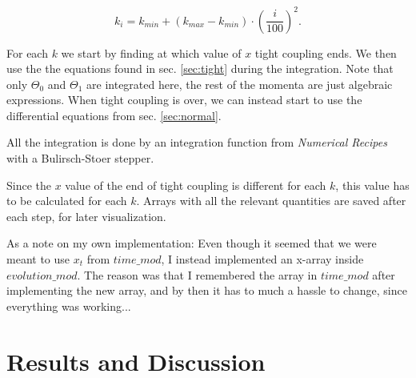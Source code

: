 \documentclass[a4paper,norsk, 10pt]{article}
\begin{document}
\begin{equation}
k_i = k_{min} + (k_{max}-k_{min})\cdot\left(\frac{i}{100}\right)^2.
\end{equation}

For each $k$ we start by finding at which value of $x$ tight coupling ends. We then use the the equations found in sec. \ref{sec:tight} during the integration. Note that only $\Theta_0$ and $\Theta_1$ are integrated here, the rest of the momenta are just algebraic expressions. When tight coupling is over, we can instead start to use the differential equations from sec. \ref{sec:normal}. 

All the integration is done by an integration function from \textit{Numerical Recipes} with a Bulirsch-Stoer stepper.

Since the $x$ value of the end of tight coupling is different for each $k$, this value has to be calculated for each $k$. Arrays with all the relevant quantities are saved after each step, for later visualization.

As a note on my own implementation: Even though it seemed that we were meant to use $x_t$ from $time\_mod$, I instead implemented an x-array inside $evolution\_mod$. The reason was that I remembered the array in $time\_mod$ after implementing the new array, and by then it has to much a hassle to change, since everything was working...

\section{Results and Discussion}
\end{document}
